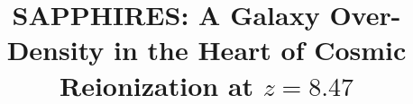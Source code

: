 \documentclass[twocolumn]{aastex631}
\begin{document}
\title{SAPPHIRES: A Galaxy Over-Density in the Heart of Cosmic Reionization at $z=8.47$}


\end{document}
